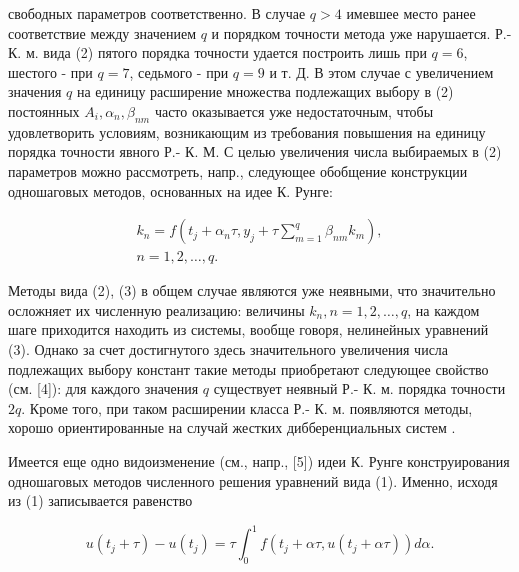 \documentclass[10pt]{article}
\begin{document}
свободных параметров соответственно. В случае $q>4$ имевшее место ранее соответствие между значением $q$ и порядком точности метода уже нарушается. Р.- К. м. вида (2) пятого порядка точности удается построить лишь при $q=6$, шестого - при $q=7$, седьмого - при $q=9$ и т. Д. В этом случае с увеличением значения $q$ на единицу расширение множества подлежащих выбору в (2) постоянных $A_{i}, \alpha_{n}, \beta_{n m}$ часто оказывается уже недостаточным, чтобы удовлетворить условиям, возникающим из требования повышения на единицу порядка точности явного Р.- К. М. С целью увеличения числа выбираемых в (2) параметров можно рассмотреть, напр., следующее обобщение конструкции одношаговых методов, основанных на идее $К$. Рунге:



\[

\begin{gathered}

k_{n}=f\left(t_{j}+\alpha_{n} \tau, y_{j}+\tau \sum_{m=1}^{q} \beta_{n m} k_{m}\right), \\

n=1,2, \ldots, q .

\end{gathered}

\]



Методы вида (2), (3) в общем случае являются уже неявными, что значительно осложняет их численную реализацию: величины $k_{n}, n=1,2, \ldots, q$, на каждом шаге приходится находить из системы, вообще говоря, нелинейных уравнений (3). Однако за счет достигнутого здесь значительного увеличения числа подлежащих выбору констант такие методы приобретают следующее свойство (см. [4]): для каждого значения $q$ существует неявный Р.- К. м. порядка точности $2 q$. Кроме того, при таком расширении класса Р.- К. м. появляются методы, хорошо ориентированные на случай жестких дибберенциальных систем .



Имеется еще одно видоизменение (см., напр., [5]) идеи К. Рунге конструирования одношаговых методов численного решения уравнений вида (1). Именно, исходя из (1) записывается равенство



\[

u\left(t_{j}+\tau\right)-u\left(t_{j}\right)=\tau \int_{0}^{1} f\left(t_{j}+\alpha \tau, u\left(t_{j}+\alpha \tau\right)\right) d \alpha .

\]
\end{document}
